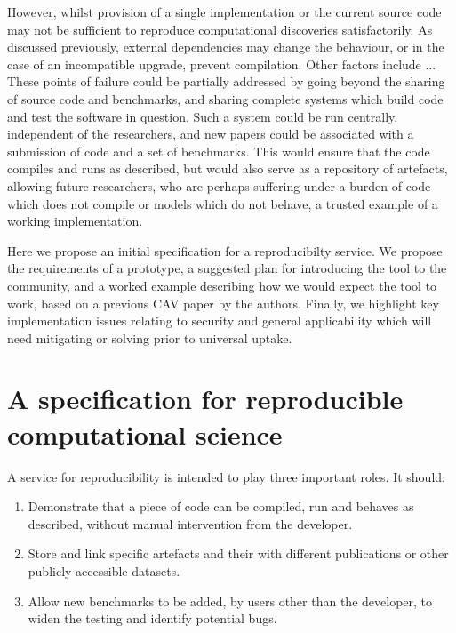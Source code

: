 \documentclass{llncs}
\begin{document}

However, whilst provision of a single implementation or the current source
code may not be sufficient to reproduce computational discoveries satisfactorily.
As discussed previously, external dependencies may change the behaviour, or 
in the case of an incompatible upgrade, prevent compilation. Other factors include
... These points of failure could be partially addressed by going beyond the sharing
of source code and benchmarks, and sharing complete systems which build code and 
test the software in question. Such a system could be run centrally, independent of 
the researchers, and new papers could be associated with a submission of code and
a set of benchmarks. This would ensure that the code compiles and runs as described,
but would also serve as a repository of artefacts, allowing future researchers,
who are perhaps suffering under a burden of code which does not compile or models
which do not behave, a trusted example of a working implementation.

Here we propose an initial specification for a reproducibilty service. We propose the
requirements of a prototype, a suggested plan for introducing the tool to the community,
and a worked example describing how we would expect the tool to work, based on a previous
CAV paper by the authors. Finally, we highlight key implementation issues relating to
security and general applicability which will need mitigating or solving prior to universal
uptake.

\section{A specification for reproducible computational science}\label{spec}

A service for reproducibility is intended to play three important roles. It should:
\begin{enumerate}
	\item Demonstrate that a piece of code can be compiled, run and behaves as described,
		without manual intervention from the developer.
	\item Store and link specific artefacts and their with different publications
		or other publicly accessible datasets.
	\item Allow new benchmarks to be added, by users other than the developer, to 
		widen the testing and identify potential bugs.
\end{enumerate}
 
\end{document}
